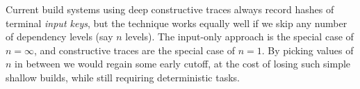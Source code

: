 Current build systems using deep constructive traces always record hashes of
terminal \emph{input keys}, but the technique works equally well if we skip any
number of dependency levels (say $n$ levels). The input-only approach is the
special case of $n = \infty$, and constructive traces are the special case of
$n = 1$. By picking values of $n$ in between we would regain some early cutoff, at the
cost of losing such simple shallow builds, while still requiring deterministic tasks.
